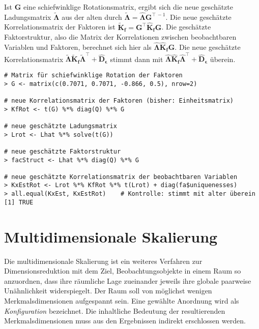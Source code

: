 Ist $\bm{G}$ eine schiefwinklige Rotationsmatrix, ergibt sich die neue geschätzte Ladungsmatrix $\tilde{\bm{\Lambda}}$ aus der alten durch $\tilde{\bm{\Lambda}} = \hat{\bm{\Lambda}} \bm{G}^{\top\,-1}$. Die neue geschätzte Korrelationsmatrix der Faktoren ist $\tilde{\bm{K}}_{\bm{f}} = \bm{G}^{\top} \hat{\bm{K}}_{\bm{f}} \bm{G}$. Die geschätzte Faktorstruktur, also die Matrix der Korrelationen zwischen beobachtbaren Variablen und Faktoren, berechnet sich hier als $\hat{\bm{\Lambda}} \hat{\bm{K}}_{\bm{f}} \bm{G}$. Die neue geschätzte Korrelationsmatrix $\tilde{\bm{\Lambda}} \tilde{\bm{K}}_{\bm{f}} \tilde{\bm{\Lambda}}^{\top} + \hat{\bm{D}}_{\bm{\epsilon}}$ stimmt dann mit $\hat{\bm{\Lambda}} \hat{\bm{K}}_{\bm{f}} \hat{\bm{\Lambda}}^{\top} + \hat{\bm{D}}_{\bm{\epsilon}}$ überein.
\begin{lstlisting}
# Matrix für schiefwinklige Rotation der Faktoren
> G <- matrix(c(0.7071, 0.7071, -0.866, 0.5), nrow=2)

# neue Korrelationsmatrix der Faktoren (bisher: Einheitsmatrix)
> KfRot <- t(G) %*% diag(Q) %*% G

# neue geschätzte Ladungsmatrix
> Lrot <- Lhat %*% solve(t(G))

# neue geschätzte Faktorstruktur
> facStruct <- Lhat %*% diag(Q) %*% G

# neue geschätzte Korrelationsmatrix der beobachtbaren Variablen
> KxEstRot <- Lrot %*% KfRot %*% t(Lrot) + diag(fa$uniquenesses)
> all.equal(KxEst, KxEstRot)    # Kontrolle: stimmt mit alter überein
[1] TRUE
\end{lstlisting}

\section{Multidimensionale Skalierung}
\label{sec:multMDS}

Die multidimensionale Skalierung ist ein weiteres Verfahren zur Dimensionsreduktion mit dem Ziel, Beobachtungsobjekte in einem Raum so anzuordnen, dass ihre räumliche Lage zueinander jeweils ihre globale paarweise Unähnlichkeit widerspiegelt. Der Raum soll von möglichst wenigen Merkmalsdimensionen aufgespannt sein. Eine gewählte Anordnung wird als \emph{Konfiguration} bezeichnet. Die inhaltliche Bedeutung der resultierenden Merkmalsdimensionen muss aus den Ergebnissen indirekt erschlossen werden.

